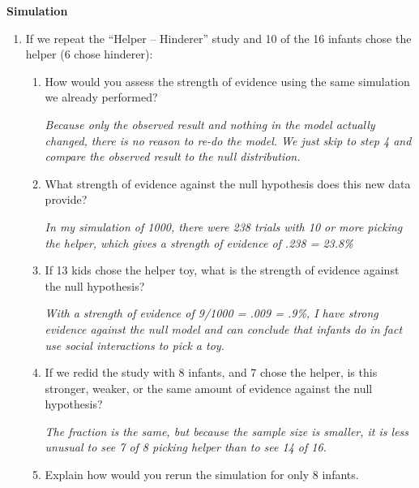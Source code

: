 \begin{center}
{\bf  Simulation}
\end{center}
\begin{enumerate}
\item If we repeat the ``Helper -- Hinderer'' study and  10 of
    the 16 infants chose the helper (6 chose hinderer):
    \begin{enumerate}
    \item How would you assess the strength of evidence using the same
      simulation we already performed?
\begin{students}
        \vspace{3.5cm}
\end{students}

\begin{key}
{\it
      Because only the observed result and nothing in the model
      actually changed, there is no reason to re-do the model.  We
      just skip to step 4 and compare the observed result to the
      null distribution. }
\end{key}
\item What strength of evidence against the null hypothesis
      does this new data provide?
\begin{students}
        \vspace{3.5cm}
\end{students}

\begin{key}
{\it
      In my simulation of 1000, there were 238 trials with 10 or
      more picking the helper, which gives a strength of evidence
      of .238 = 23.8\%}
\end{key}
\item If 13 kids chose the helper toy, what is the strength of evidence
  against the null hypothesis? 
\begin{students}
        \vspace{3.5cm}
\end{students}

\begin{key}
{\it
       With a strength of evidence of 9/1000 = .009 = .9\%, I have
      strong evidence against the null model and can conclude that
      infants do in fact use social interactions to pick a toy. }
\end{key}
\item If we redid the study with 8 infants, and 7 chose the
      helper, is this stronger, weaker, or the same amount of evidence
      against the null hypothesis?      
\begin{key}
{\it
      The fraction is the same, but because the sample size is
      smaller, it is less unusual to see 7 of 8 picking helper than
      to see 14 of 16.}
\end{key}
\item Explain how would you rerun the simulation for only 8 infants.
\begin{students}
        \vspace{2cm}
\end{students}
      

\end{enumerate}
\end{enumerate}
